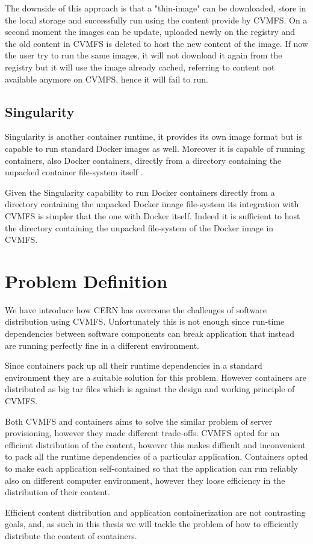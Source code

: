 The downside of this approach is that a "thin-image" can be downloaded, store in
the local storage and successfully run using the content provide by CVMFS. On a
second moment the images can be update, uploaded newly on the registry and the
old content in CVMFS is deleted to host the new content of the image. If now
the user try to run the same images, it will not download it again from the
registry but it will use the image already cached, referring
to content not available anymore on CVMFS, hence it will fail to run.

\subsection{Singularity}\label{subsec:singularity}

Singularity \citep{singularity:home} is another container runtime, it provides
its own image format but is capable to run standard Docker images
\cite{singularity:docker} as well.  Moreover it is capable of running
containers, also Docker containers, directly from a directory containing the
unpacked container file-system itself \cite{singularity:run}.

Given the Singularity capability to run Docker containers directly from a
directory containing the unpacked Docker image file-system its integration with
CVMFS is simpler that the one with Docker itself. Indeed it is sufficient to
host the directory containing the unpacked file-system of the Docker image in
CVMFS.

\section{Problem Definition}\label{sec:problem}

We have introduce how CERN has overcome the challenges of software distribution
using CVMFS. Unfortunately this is not enough since run-time dependencies
between software components can break application that instead are running
perfectly fine in a different environment.

Since containers pack up all their runtime dependencies in a standard
environment they are a suitable solution for this problem. However containers
are distributed as big tar files which is against the design and working
principle of CVMFS.

Both CVMFS and containers aims to solve the similar problem of server
provisioning, however they made different trade-offs. CVMFS opted for an
efficient distribution of the content, however this makes difficult and
inconvenient to pack all the runtime dependencies of a particular application.
Containers opted to make each application self-contained so that the
application can run reliably also on different computer environment, however
they loose efficiency in the distribution of their content.

Efficient content distribution and application containerization are not
contrasting goals, and, as such in this thesis we will tackle the problem of
how to efficiently distribute the content of containers.

